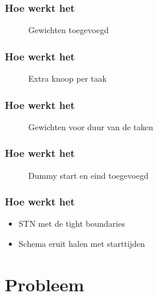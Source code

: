 \documentclass{beamer}
\theoremstyle{definition}
\newcommand{\inputtikz}[1]{}
\begin{document}
\begin{frame}
    	\frametitle{Hoe werkt het}
	
	\begin{figure}[ht]
		\inputtikz{stn_weighted}
		\vspace{-1em}
		\caption{Gewichten toegevoegd}
	\end{figure}
\end{frame}

\begin{frame}
    	\frametitle{Hoe werkt het}
	
	\begin{figure}[ht]
		\inputtikz{stn_expanded}
		\vspace{-1em}
		\caption{Extra knoop per taak}
	\end{figure}
\end{frame}

\begin{frame}
    	\frametitle{Hoe werkt het}
	
	\begin{figure}[ht]
		\inputtikz{stn}
		\vspace{-1em}
		\caption{Gewichten voor duur van de taken}
	\end{figure}
\end{frame}

\begin{frame}
    	\frametitle{Hoe werkt het}
	
	\begin{figure}[ht]
		\makebox[\textwidth][c]{\resizebox{1\paperwidth}{!}{
			\inputtikz{stn_dummy}
		}}
		\vspace{-1em}
		\caption{Dummy start en eind toegevoegd}
	\end{figure}
\end{frame}

\begin{frame}
    	\frametitle{Hoe werkt het}
	\begin{itemize}
		\item STN met de tight boundaries
		\item Schema eruit halen met starttijden
	\end{itemize}
\end{frame}

\section{Probleem}
\end{document}
